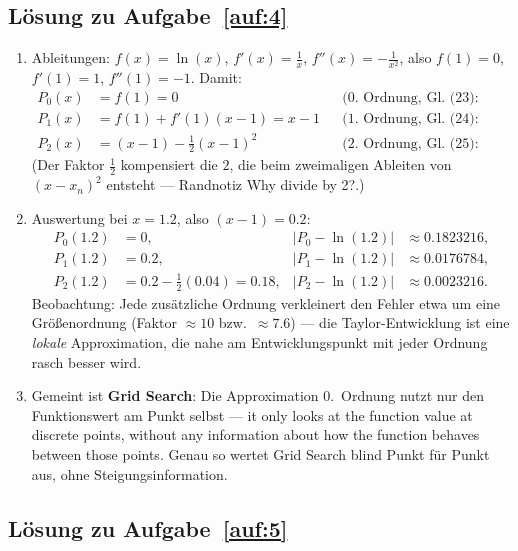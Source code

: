 \documentclass[a4paper,11pt]{scrartcl}
\begin{document}
\subsection*{Lösung zu Aufgabe~\ref{auf:4}}

\begin{enumerate}[label=(\alph*)]
  \item Ableitungen: $f(x) = \ln(x)$, $f'(x) = \frac{1}{x}$, $f''(x) = -\frac{1}{x^2}$,
  also $f(1) = 0$, $f'(1) = 1$, $f''(1) = -1$. Damit:
  \begin{align*}
    P_0(x) &= f(1) = 0 && \text{(0.~Ordnung, Gl.~(23): Funktionswert matchen)}\\
    P_1(x) &= f(1) + f'(1)(x - 1) = x - 1 && \text{(1.~Ordnung, Gl.~(24): Steigung matchen)}\\
    P_2(x) &= (x - 1) - \tfrac{1}{2}(x - 1)^2 && \text{(2.~Ordnung, Gl.~(25): Krümmung matchen)}
  \end{align*}
  (Der Faktor $\frac{1}{2}$ kompensiert die $2$, die beim zweimaligen Ableiten von
  $(x - x_n)^2$ entsteht --- Randnotiz \glqq Why divide by 2?\grqq.)
  \item Auswertung bei $x = 1.2$, also $(x-1) = 0.2$:
  \begin{align*}
    P_0(1.2) &= 0, & |P_0 - \ln(1.2)| &\approx 0.1823216,\\
    P_1(1.2) &= 0.2, & |P_1 - \ln(1.2)| &\approx 0.0176784,\\
    P_2(1.2) &= 0.2 - \tfrac{1}{2}(0.04) = 0.18, & |P_2 - \ln(1.2)| &\approx 0.0023216.
  \end{align*}
  Beobachtung: Jede zusätzliche Ordnung verkleinert den Fehler etwa um eine
  Größenordnung (Faktor $\approx 10$ bzw.\ $\approx 7.6$) --- die Taylor-Entwicklung ist
  eine \emph{lokale} Approximation, die nahe am Entwicklungspunkt mit jeder Ordnung
  rasch besser wird.
  \item Gemeint ist \textbf{Grid Search}: Die Approximation 0.~Ordnung nutzt nur den
  Funktionswert am Punkt selbst --- \glqq it only looks at the function value at
  discrete points, without any information about how the function behaves between those
  points.\grqq{} Genau so wertet Grid Search blind Punkt für Punkt aus, ohne
  Steigungsinformation.
\end{enumerate}

\subsection*{Lösung zu Aufgabe~\ref{auf:5}}
\end{document}
